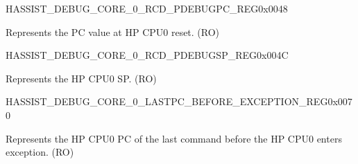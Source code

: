 \begin{register}{H}{ASSIST\_DEBUG\_CORE\_0\_RCD\_PDEBUGPC\_REG}{0x0048}\label{regdesc:ASSISTDEBUGCORE0RCDPDEBUGPCREG}
%
\regnewline%
\begin{regdesc}\begin{reglist}
\label{fielddesc:ASSISTDEBUGCORE0RCDPDEBUGPC}\item [ASSIST\_DEBUG\_CORE\_0\_RCD\_PDEBUGPC] Represents the PC value at HP CPU0 reset. (RO)
\end{reglist}\end{regdesc}
\end{register}


\begin{register}{H}{ASSIST\_DEBUG\_CORE\_0\_RCD\_PDEBUGSP\_REG}{0x004C}\label{regdesc:ASSISTDEBUGCORE0RCDPDEBUGSPREG}
%
\regnewline%
\begin{regdesc}\begin{reglist}
\label{fielddesc:ASSISTDEBUGCORE0RCDPDEBUGSP}\item [ASSIST\_DEBUG\_CORE\_0\_RCD\_PDEBUGSP] Represents the HP CPU0 SP. (RO)
\end{reglist}\end{regdesc}
\end{register}


\begin{register}{H}{ASSIST\_DEBUG\_CORE\_0\_LASTPC\_BEFORE\_EXCEPTION\_REG}{0x0070}\label{regdesc:ASSISTDEBUGCORE0LASTPCBEFOREEXCEPTIONREG}
%
\regnewline%
\begin{regdesc}\begin{reglist}
\label{fielddesc:ASSISTDEBUGCORE0LASTPCBEFOREEXC}\item [ASSIST\_DEBUG\_CORE\_0\_LASTPC\_BEFORE\_EXC] Represents the HP CPU0 PC of the last command before the HP CPU0 enters exception. (RO)
\end{reglist}\end{regdesc}
\end{register}



